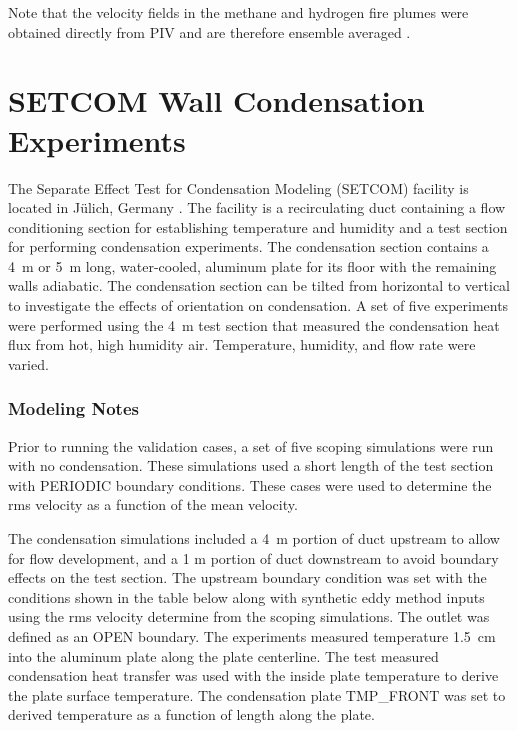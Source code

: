 Note that the velocity fields in the methane and hydrogen fire plumes were obtained directly from PIV and are therefore ensemble averaged \cite{Tieszen:2004,Tieszen:2002}.

\section{SETCOM Wall Condensation Experiments}
\label{SETCOM_Cond_Description}

The Separate Effect Test for Condensation Modeling (SETCOM) facility is located in J\"{u}lich, Germany \cite{setcom_cfd}. The facility is a recirculating duct containing a flow conditioning section for establishing temperature and humidity and a test section for performing condensation experiments. The condensation section contains a 4~m or 5~m long, water-cooled, aluminum plate for its floor with the remaining walls adiabatic. The condensation section can be tilted from horizontal to vertical to investigate the effects of orientation on condensation. A set of five experiments were performed using the 4~m test section that measured the condensation heat flux from hot, high humidity air. Temperature, humidity, and flow rate were varied.

\subsubsection{Modeling Notes}

Prior to running the validation cases, a set of five scoping simulations were run with no condensation. These simulations used a short length of the test section with {\ct PERIODIC} boundary conditions. These cases were used to determine the rms velocity as a function of the mean velocity.

The condensation simulations included a 4~m portion of duct upstream to allow for flow development, and a 1 m portion of duct downstream to avoid boundary effects on the test section. The upstream boundary condition was set with the conditions shown in the table below along with synthetic eddy method inputs using the rms velocity determine from the scoping simulations. The outlet was defined as an {\ct OPEN} boundary. The experiments measured temperature 1.5~cm into the aluminum plate along the plate centerline. The test measured condensation heat transfer was used with the inside plate temperature to derive the plate surface temperature. The condensation plate {\ct TMP\_FRONT} was set to derived temperature as a function of length along the plate.

